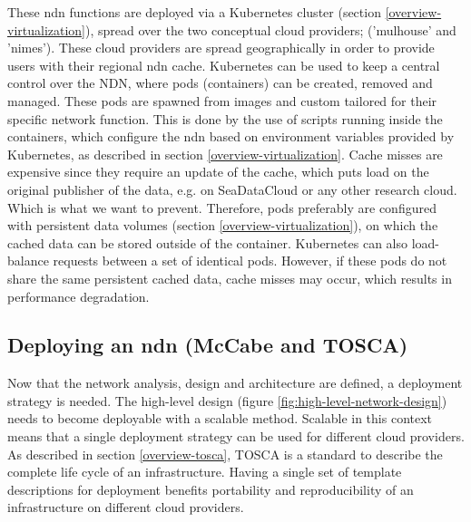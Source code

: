 
These \gls{ndn} functions are deployed via a Kubernetes cluster (section \ref{overview-virtualization}), spread over the two conceptual cloud providers; ('mulhouse' and 'nimes'). These cloud providers are spread geographically in order to provide users with their regional \gls{ndn} cache. Kubernetes can be used to keep a central control over the NDN, where pods (containers) can be created, removed and managed. These pods are spawned from images and custom tailored for their specific network function. This is done by the use of scripts running inside the containers, which configure the \gls{ndn} based on environment variables provided by Kubernetes, as described in section \ref{overview-virtualization}. Cache misses are expensive since they require an update of the cache, which puts load on the original publisher of the data, e.g. on SeaDataCloud or any other research cloud. Which is what we want to prevent. Therefore, pods preferably are configured with persistent data volumes (section \ref{overview-virtualization}), on which the cached data can be stored outside of the container. Kubernetes can also load-balance requests between a set of identical pods. However, if these pods do not share the same persistent cached data, cache misses may occur, which results in performance degradation.

\subsection{Deploying an \gls{ndn} (McCabe and TOSCA)}
\label{planning-deploying}
Now that the network analysis, design and architecture are defined, a deployment strategy is needed. The high-level design (figure \ref{fig:high-level-network-design}) needs to become deployable with a scalable method. Scalable in this context means that a single deployment strategy can be used for different cloud providers. As described in section \ref{overview-tosca}, TOSCA is a standard to describe the complete life cycle of an infrastructure. Having a single set of template descriptions for deployment benefits portability and reproducibility of an infrastructure on different cloud providers.

